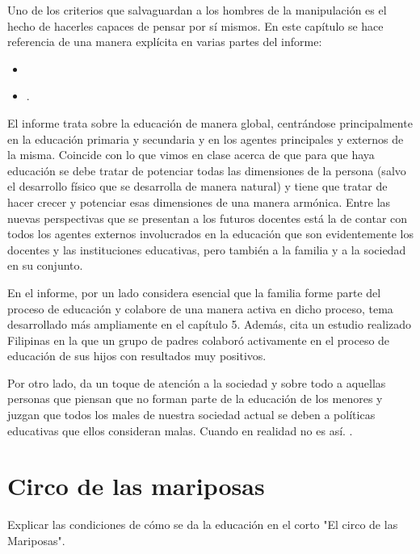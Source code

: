 Uno de los criterios que salvaguardan a los hombres de la manipulación es el hecho de hacerles capaces de pensar por sí mismos.
%
En este capítulo se hace referencia de una manera explícita en varias partes del informe:

\begin{itemize}
\item {}
\item {}.
\end{itemize}



El informe trata sobre la educación de manera global, centrándose principalmente en la educación primaria y secundaria y en los agentes principales y externos de la misma.
%
Coincide con lo que vimos en clase acerca de que para que haya educación se debe tratar de potenciar todas las dimensiones de la persona (salvo el desarrollo físico que se desarrolla de manera natural) y tiene que tratar de hacer crecer y potenciar esas dimensiones de una manera armónica.
%
Entre las nuevas perspectivas que se presentan a los futuros docentes está la de contar con todos los agentes externos involucrados en la educación que son evidentemente los docentes y las instituciones educativas, pero también a la familia y a la sociedad en su conjunto.
%

En el informe, por un lado considera esencial que la familia forme parte del proceso de educación y colabore de una manera activa en dicho proceso, tema desarrollado más ampliamente en el capítulo 5.
%
Además, cita un estudio realizado Filipinas en la que un grupo de padres colaboró activamente en el proceso de educación de sus hijos con resultados muy positivos.

Por otro lado, da un toque de atención a la sociedad y sobre todo a aquellas personas que piensan que no forman parte de la educación de los menores y juzgan que todos los males de nuestra sociedad actual se deben a políticas educativas que ellos consideran malas.
%
Cuando en realidad no es así.
%
.



\section{Circo de las mariposas}

Explicar las condiciones de cómo se da la educación en el corto "El circo de las Mariposas".
